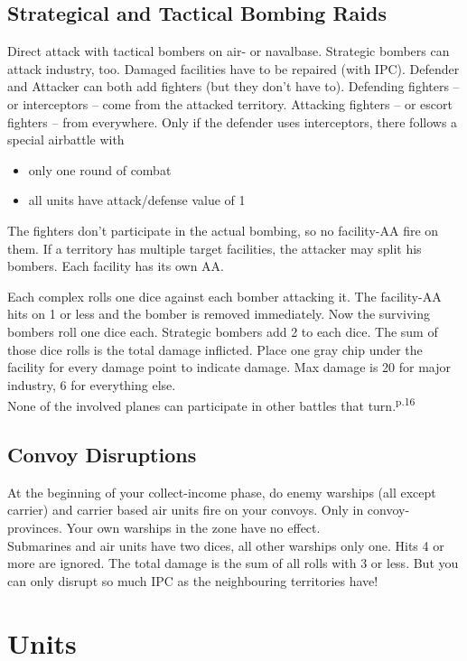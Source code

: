 \documentclass[10pt,twoside]{article}
\begin{document}
\begin{multicols*}{3}
\subsection*{Strategical and Tactical Bombing Raids}
Direct attack with tactical bombers on air- or navalbase. Strategic bombers can attack industry, too.
Damaged facilities have to be repaired (with IPC). Defender and Attacker can both add fighters (but they don't have to). Defending fighters -- or interceptors -- come from the attacked territory. Attacking fighters -- or escort fighters -- from everywhere. Only if the defender uses interceptors, there follows a special airbattle with
\begin{itemize}
\item only one round of combat
\item all units have attack/defense value of 1
\end{itemize}
The fighters don't participate in the actual bombing, so no facility-AA fire on them. If a territory has multiple target facilities, the attacker may split his bombers. Each facility has its own AA.

Each complex rolls one dice against each bomber attacking it. The facility-AA hits on 1 or less and the bomber is removed immediately. Now the surviving bombers roll one dice each. Strategic bombers add 2 to each dice. The sum of those dice rolls is the total damage inflicted. Place one gray chip under the facility for every damage point to indicate damage. Max damage is 20 for major industry, 6 for everything else.\\
None of the involved planes can participate in other battles that turn.\textsuperscript{p.16}

\subsection*{Convoy Disruptions}
At the beginning of your collect-income phase, do enemy warships (all except carrier) and carrier based air units fire on your convoys. Only in convoy-provinces. Your own warships in the zone have no effect.\\
Submarines and air units have two dices, all other warships only one. Hits 4 or more are ignored. The total damage is the sum of all rolls with 3 or less. But you can only disrupt so much IPC as the neighbouring territories have!

\pagebreak

\section*{Units}

\end{multicols*}
\end{document}
